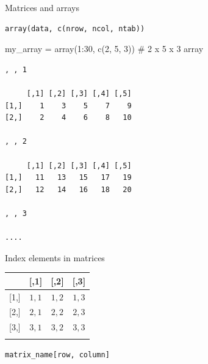 \documentclass[
  ignorenonframetext,
]{beamer}
\newenvironment{Shaded}{\begin{snugshade}}{\end{snugshade}}
\newcommand{\CommentTok}[1]{\textcolor[rgb]{0.54,0.53,0.53}{#1}}
\newcommand{\DecValTok}[1]{\textcolor[rgb]{0.69,0.50,0.00}{#1}}
\newcommand{\FunctionTok}[1]{\textcolor[rgb]{0.39,0.29,0.61}{#1}}
\newcommand{\NormalTok}[1]{\textcolor[rgb]{0.12,0.11,0.11}{#1}}
\newcommand{\OtherTok}[1]{\textcolor[rgb]{0.00,0.43,0.16}{#1}}
\newcommand{\SpecialCharTok}[1]{\textcolor[rgb]{0.24,0.68,0.91}{#1}}
\begin{document}
\begin{frame}[fragile]{Matrices and arrays}
\protect\hypertarget{matrices-and-arrays-2}{}
\small

\begin{verbatim}
array(data, c(nrow, ncol, ntab))
\end{verbatim}

\begin{Shaded}
\begin{Highlighting}[]
\NormalTok{my\_array }\OtherTok{=} \FunctionTok{array}\NormalTok{(}\DecValTok{1}\SpecialCharTok{:}\DecValTok{30}\NormalTok{, }\FunctionTok{c}\NormalTok{(}\DecValTok{2}\NormalTok{, }\DecValTok{5}\NormalTok{, }\DecValTok{3}\NormalTok{)) }\CommentTok{\# 2 x 5 x 3 array}
\end{Highlighting}
\end{Shaded}

\footnotesize

\begin{verbatim}
, , 1

     [,1] [,2] [,3] [,4] [,5]
[1,]    1    3    5    7    9
[2,]    2    4    6    8   10

, , 2

     [,1] [,2] [,3] [,4] [,5]
[1,]   11   13   15   17   19
[2,]   12   14   16   18   20

, , 3

....
\end{verbatim}
\end{frame}

\begin{frame}[fragile]{Index elements in matrices}
\protect\hypertarget{index-elements-in-matrices}{}
\begin{longtable}[]{@{}lccc@{}}
\toprule\noalign{}
& {[},1{]} & {[},2{]} & {[},3{]} \\
\midrule\noalign{}
\endhead
{[}1,{]} & \(1, 1\) & \(1, 2\) & \(1, 3\) \\
{[}2,{]} & \(2, 1\) & \(2, 2\) & \(2, 3\) \\
{[}3,{]} & \(3, 1\) & \(3, 2\) & \(3, 3\) \\
\bottomrule\noalign{}
\end{longtable}

\centering

\texttt{matrix\_name{[}row,\ column{]}}
\end{frame}
\end{document}
